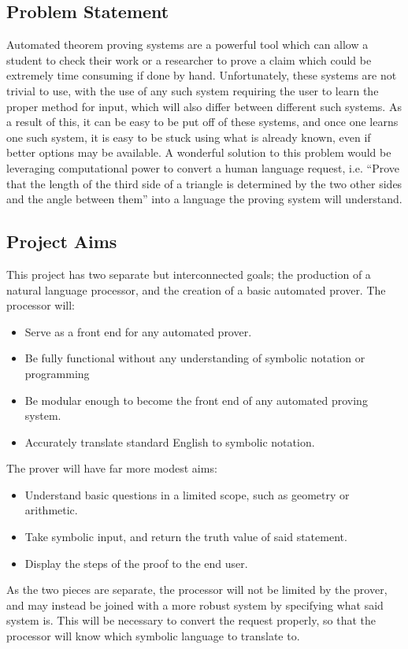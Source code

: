 \documentclass[12pt]{article}
\begin{document}
\subsection{Problem Statement}
Automated theorem proving systems are a powerful tool which can allow a student to check their work or a researcher to prove a claim which could be extremely time consuming if done by hand. Unfortunately, these systems are not trivial to use, with the use of any such system requiring the user to learn the proper method for input, which will also differ between different such systems. As a result of this, it can be easy to be put off of these systems, and once one learns one such system, it is easy to be stuck using what is already known, even if better options may be available. A wonderful solution to this problem would be leveraging computational power to convert a human language request, i.e. ``Prove that the length of the third side of a triangle is determined by the two other sides and the angle between them'' into a language the proving system will understand.


\subsection{Project Aims}
This project has two separate but interconnected goals; the production of a natural language processor, and the creation of a basic automated prover. The processor will:
\begin{itemize}
\item{Serve as a front end for any automated prover.}
\item{Be fully functional without any understanding of symbolic notation or programming}
\item{Be modular enough to become the front end of any automated proving system.}
\item{Accurately translate standard English to symbolic notation.}
\end{itemize}

The prover will have far more modest aims:
\begin{itemize}
\item{Understand basic questions in a limited scope, such as geometry or arithmetic.}
\item{Take symbolic input, and return the truth value of said statement.}
\item{Display the steps of the proof to the end user.}
\end{itemize}

As the two pieces are separate, the processor will not be limited by the prover, and may instead be joined with a more robust system by specifying what said system is. This will be necessary to convert the request properly, so that the processor will know which symbolic language to translate to.
\end{document}
